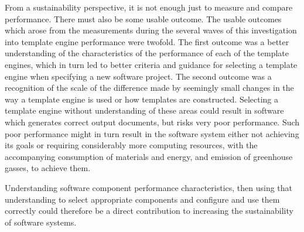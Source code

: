 From a sustainability perspective, it is not enough just to measure and compare performance. There must also be some usable outcome. The usable outcomes which arose from the measurements during the several waves of this investigation into template engine performance were twofold. The first outcome was a better understanding of the characteristics of the performance of each of the template engines, which in turn led to better criteria and guidance for selecting a template engine when specifying a new software project.  The second outcome was a recognition of the scale of the difference made by seemingly small changes in the way a template engine is used or how templates are constructed. Selecting a template engine without understanding of these areas could result in software which generates correct output documents, but risks very poor performance. Such poor performance might in turn result in the software system either not achieving its goals or requiring considerably more computing resources, with the accompanying consumption of materials and energy, and emission of greenhouse gasses, to achieve them.

Understanding software component performance characteristics, then using that understanding to select appropriate components and configure and use them correctly could therefore be a direct contribution to increasing the sustainability of software systems.
